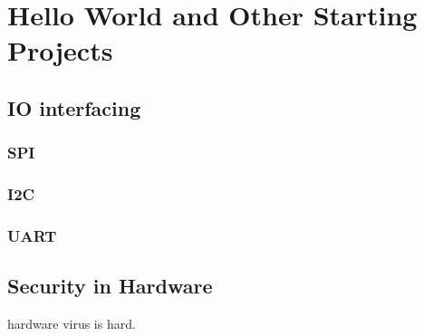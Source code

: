 \chapter{Hello World and Other Starting Projects}

\section{IO interfacing}
\subsection{SPI}
\subsection{I2C}
\subsection{UART}

\section{Security in Hardware}
hardware virus is hard. 